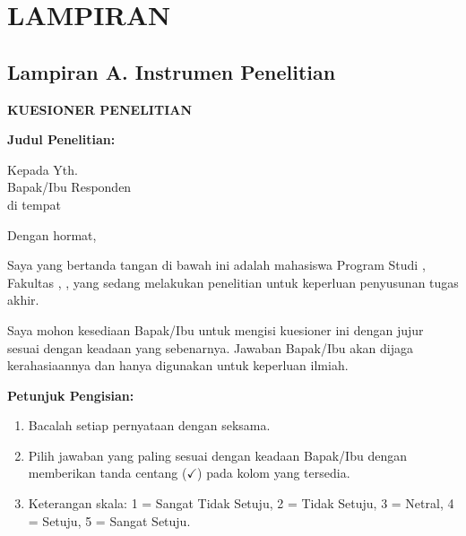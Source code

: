 
\chapter*{LAMPIRAN}
\thispagestyle{plain}

\section*{Lampiran A. Instrumen Penelitian}
\label{lampiran:kuesioner}

\textbf{KUESIONER PENELITIAN}

\vspace{0.5cm}

\noindent
\textbf{Judul Penelitian:} \JudulTA

\vspace{0.3cm}

\noindent
Kepada Yth.\\
Bapak/Ibu Responden\\
di tempat

\vspace{0.3cm}

\noindent
Dengan hormat,

Saya yang bertanda tangan di bawah ini adalah mahasiswa Program Studi \NamaProdi,
Fakultas \NamaFakultas, \NamaUniversitas, yang sedang melakukan penelitian untuk
keperluan penyusunan tugas akhir.

Saya mohon kesediaan Bapak/Ibu untuk mengisi kuesioner ini dengan jujur sesuai
dengan keadaan yang sebenarnya. Jawaban Bapak/Ibu akan dijaga kerahasiaannya dan
hanya digunakan untuk keperluan ilmiah.

\vspace{0.5cm}

\noindent
\textbf{Petunjuk Pengisian:}
\begin{enumerate}
  \item Bacalah setiap pernyataan dengan seksama.
  \item Pilih jawaban yang paling sesuai dengan keadaan Bapak/Ibu dengan memberikan
        tanda centang ($\checkmark$) pada kolom yang tersedia.
  \item Keterangan skala: 1 = Sangat Tidak Setuju, 2 = Tidak Setuju, 3 = Netral,
        4 = Setuju, 5 = Sangat Setuju.
\end{enumerate}

